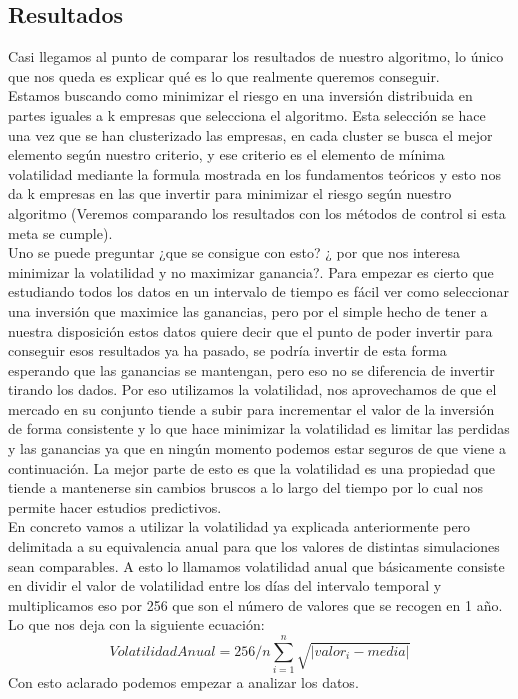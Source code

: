 \documentclass[12pt,a4paper]{article}
\begin{document}
		\subsection{Resultados}
		Casi llegamos al punto de comparar los resultados de nuestro algoritmo, lo único que nos queda es explicar qué es lo que realmente queremos conseguir.\\
		Estamos buscando como minimizar el riesgo en una inversión distribuida en partes iguales a k empresas que selecciona el algoritmo. Esta selección se hace una vez que se han clusterizado las empresas, en cada cluster se busca el mejor elemento según nuestro criterio, y ese criterio es el elemento de mínima volatilidad mediante la formula mostrada en los fundamentos teóricos y esto nos da k empresas en las que invertir para minimizar el riesgo según nuestro algoritmo (Veremos comparando los resultados con los métodos de control si esta meta se cumple).\\
		Uno se puede preguntar ¿que se consigue con esto? ¿ por que nos interesa minimizar la volatilidad y no maximizar ganancia?. Para empezar es cierto que estudiando todos los datos en un intervalo de tiempo es fácil ver como seleccionar una inversión que maximice las ganancias, pero por el simple hecho de tener a nuestra disposición estos datos quiere decir que el punto de poder invertir para conseguir esos resultados ya ha pasado, se podría invertir de esta forma esperando que las ganancias se mantengan, pero eso no se diferencia de invertir tirando los dados. Por eso utilizamos la volatilidad, nos aprovechamos de que el mercado en su conjunto tiende a subir para incrementar el valor de la inversión de forma consistente y lo que hace minimizar la volatilidad es limitar las perdidas y las ganancias ya que en ningún momento podemos estar seguros de que viene a continuación. La mejor parte de esto es que la volatilidad es una propiedad que tiende a mantenerse sin cambios bruscos a lo largo del tiempo por lo cual nos permite hacer estudios predictivos.\\
		En concreto vamos a utilizar la volatilidad ya explicada anteriormente pero delimitada a su equivalencia anual para que los valores de distintas simulaciones sean comparables. A esto lo llamamos volatilidad anual que básicamente consiste en dividir el valor de volatilidad entre los días del intervalo temporal y multiplicamos eso por 256 que son el número de valores que se recogen en 1 año. Lo que nos deja con la siguiente ecuación:
		\[VolatilidadAnual = {256}/{n}\sum_{i=1}^{n} \sqrt{\left | valor_i - media \right |} \]
		Con esto aclarado podemos empezar a analizar los datos.\\
\end{document}
